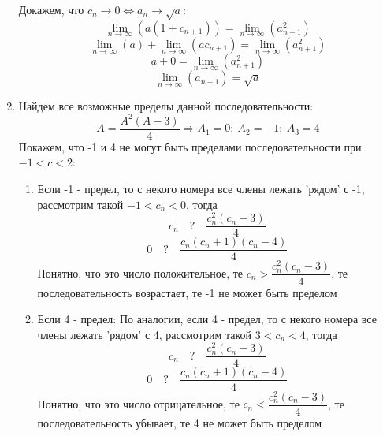 \documentclass{report}
\begin{document}
\begin{enumerate}
Докажем, что $c_n \rightarrow 0 \Leftrightarrow a_{n}\rightarrow \sqrt{a}$:
	\begin{equation*}
        \lim_{n\rightarrow\infty}{(a(1 + c_{n+1}))} = \lim_{n\rightarrow\infty}{(a_{n+1}^2)}
    \end{equation*}
    \begin{equation*}
        \lim_{n\rightarrow\infty}{(a)} + \lim_{n\rightarrow\infty}{(a c_{n+1})} = \lim_{n\rightarrow\infty}{(a_{n+1}^2)}
    \end{equation*}
    \begin{equation*}
        a + 0 = \lim_{n\rightarrow\infty}{(a_{n+1}^2)}
    \end{equation*}
    \begin{equation*}
        \lim_{n\rightarrow\infty}{(a_{n+1})} = \sqrt{a}
    \end{equation*}
\item
	Найдем все возможные пределы данной последовательности:
	\begin{equation*}
		A=\dfrac{A^2(A-3)}{4} \Rightarrow A_1=0; \: A_2=-1; \: A_3=4
        \end{equation*}
Покажем, что -1 и 4 не могут быть пределами последовательности при $-1<c<2$:
\begin{enumerate}
    \item Если -1 - предел, то с некого номера все члены лежать 'рядом' с -1, рассмотрим такой $-1<c_n<0$, тогда
    \begin{equation*}
        c_n \quad?\quad \dfrac{c_n^2(c_n-3)}{4}
    \end{equation*}
    \begin{equation*}
          0 \quad?\quad \dfrac{c_n(c_n+1)(c_n-4)}{4}
    \end{equation*}
    Понятно, что это число положительное, те $c_n>\dfrac{c_n^2(c_n-3)}{4}$, те последовательность возрастает, те -1 не может быть пределом
\item Если 4 - предел:
    По аналогии, если 4 - предел, то с некого номера все члены лежать 'рядом' с 4, рассмотрим такой $3<c_n<4$, тогда
        \begin{equation*}
            c_n \quad?\quad \dfrac{c_n^2(c_n-3)}{4}
        \end{equation*}
        \begin{equation*}
            0 \quad?\quad \dfrac{c_n(c_n+1)(c_n-4)}{4}
        \end{equation*}
Понятно, что это число отрицательное, те $c_n<\dfrac{c_n^2(c_n-3)}{4}$, те последовательность убывает, те 4 не может быть пределом\\

\end{enumerate}
\end{enumerate}
\end{document}
